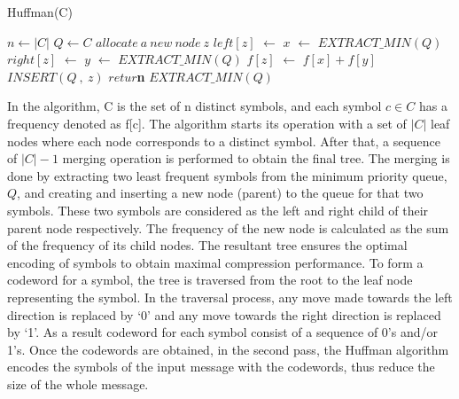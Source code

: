 \documentclass[preprint,12pt]{elsarticle}
\begin{document}
\begin{algorithm}[!thpb]
\label{alg1}
\caption{Huffman(C)}
\begin{algorithmic}[1]
\State $n \leftarrow |C|$
\State $Q \leftarrow C$
\State $allocate~a~new~node~z$
\State $left[z]$ $\leftarrow$ $x$ $\leftarrow$ $EXTRACT\_MIN (Q)$
\State $right[z]$ $\leftarrow$ $y$ $\leftarrow$ $EXTRACT\_MIN (Q)$
\State $f[z]$ $\leftarrow$ $f[x] + f[y]$
\State $INSERT (Q~,~z)$
\ENDFOR
\State \textbf{$retur$n} $EXTRACT\_MIN (Q)$
\end{algorithmic}
\end{algorithm}
In the algorithm, C is the set of n distinct symbols, and each symbol $ c\in C$ has a frequency denoted as f[c]. The algorithm starts its operation with a set of $|C|$  leaf nodes where each node corresponds to a distinct symbol. After that, a sequence of $|C|-1$ merging operation is performed to obtain the final tree. The merging is done by extracting two least frequent symbols from the minimum priority queue, $Q$, and creating and inserting a new node (parent) to the queue for that two symbols. These two symbols are considered as the left and right child of their parent node respectively. The frequency of the new  node is calculated as the sum of the frequency of its child nodes.  The resultant tree ensures the optimal encoding of symbols to obtain maximal compression performance. %
To form a codeword for a symbol, the tree is traversed from the  root to the leaf node representing the symbol. In the traversal process, any move made towards the left direction is replaced by `0' and any move towards the right direction is replaced by `1'. As a result codeword for each symbol consist of a sequence of 0's and/or 1's. Once the codewords are obtained, in the second pass, the Huffman algorithm encodes the symbols of the input message with the codewords, thus reduce the size of the whole message.
\end{document}
